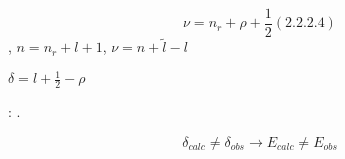 \documentclass[a4paper]{article}
\begin{document}
\begin{equation*}
\nu =n_r+\rho +\frac 1 2(2.2.2.4)
\end{equation*}
{\CYRU}{\cyrch}{\cyri}{\cyrt}{\cyrery}{\cyrv}{\cyra}{\cyrya}, {\cyrch}{\cyrt}{\cyro}  $n=n_r+l+1$,  $\nu =n+\widetilde
l-l$

{\CYRD}{\cyrl}{\cyrya} {\cyrk}{\cyrv}{\cyra}{\cyrn}{\cyrt}{\cyro}{\cyrv}{\cyro}{\cyrg}{\cyro}
{\cyrd}{\cyre}{\cyrf}{\cyre}{\cyrk}{\cyrt}{\cyra} {\cyrt}{\cyro}{\cyrg}{\cyrd}{\cyra}
{\cyrp}{\cyro}{\cyrl}{\cyru}{\cyrch}{\cyri}{\cyrm} {\cyrv}{\cyrery}{\cyrr}{\cyra}{\cyrzh}{\cyre}{\cyrn}{\cyri}{\cyre}
$\delta =l+\frac 1 2-\rho $

{\CYRP}{\cyrr}{\cyri} {\cyri}{\cyrs}{\cyrp}{\cyro}{\cyrl}{\cyrsftsn}{\cyrz}{\cyro}{\cyrv}{\cyra}{\cyrn}{\cyri}{\cyri}
{\cyri}{\cyrs}{\cyrk}{\cyrl}{\cyryu}{\cyrch}{\cyri}{\cyrt}{\cyre}{\cyrl}{\cyrsftsn}{\cyrn}{\cyro}
{\cyrt}{\cyre}{\cyro}{\cyrr}{\cyre}{\cyrt}{\cyri}{\cyrch}{\cyre}{\cyrs}{\cyrk}{\cyri}{\cyrh}
{\cyrp}{\cyro}{\cyrs}{\cyrt}{\cyrr}{\cyro}{\cyre}{\cyrn}{\cyri}{\cyrishrt}
{\cyrv}{\cyro}{\cyrz}{\cyrn}{\cyri}{\cyrk}{\cyra}{\cyre}{\cyrt}
{\cyrs}{\cyrl}{\cyre}{\cyrd}{\cyru}{\cyryu}{\cyrshch}{\cyra}{\cyrya}
{\cyrp}{\cyrr}{\cyro}{\cyrb}{\cyrl}{\cyre}{\cyrm}{\cyra}:
{\cyrr}{\cyra}{\cyrs}{\cyrs}{\cyrch}{\cyri}{\cyrt}{\cyra}{\cyrn}{\cyrn}{\cyrery}{\cyre}
{\cyrk}{\cyrv}{\cyra}{\cyrn}{\cyrt}{\cyro}{\cyrv}{\cyrery}{\cyre} {\cyrd}{\cyre}{\cyrf}{\cyre}{\cyrk}{\cyrt}{\cyrery}
{\cyrv}{\cyrk}{\cyrl}{\cyryu}{\cyrch}{\cyra}{\cyryu}{\cyrt} {\cyrv} {\cyrs}{\cyre}{\cyrb}{\cyrya}
{\cyrt}{\cyro}{\cyrl}{\cyrsftsn}{\cyrk}{\cyro} {\cyrd}{\cyri}{\cyrp}{\cyro}{\cyrl}{\cyrsftsn}{\cyrn}{\cyru}{\cyryu}
{\cyrch}{\cyra}{\cyrs}{\cyrt}{\cyrsftsn} {\cyri} {\cyrn}{\cyre}
{\cyru}{\cyrch}{\cyri}{\cyrt}{\cyrery}{\cyrv}{\cyra}{\cyryu}{\cyrt}
{\cyrk}{\cyro}{\cyrr}{\cyro}{\cyrt}{\cyrk}{\cyro}{\cyrd}{\cyre}{\cyrishrt}{\cyrs}{\cyrt}{\cyrv}{\cyru}{\cyryu}{\cyrshch}{\cyru}{\cyryu}
{\cyrch}{\cyra}{\cyrs}{\cyrt}{\cyrsftsn} {\cyrp}{\cyro}{\cyrt}{\cyre}{\cyrn}{\cyrc}{\cyri}{\cyra}{\cyrl}{\cyra}.

\begin{equation*}
\delta _{\mathit{calc}}{\neq}\delta _{\mathit{obs}}\rightarrow E_{\mathit{calc}}{\neq}E_{\mathit{obs}}
\end{equation*}
\end{document}
